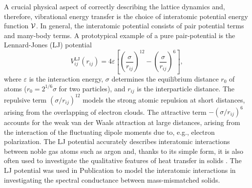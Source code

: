 A crucial physical aspect of correctly describing the lattice dynamics and, therefore, vibrational energy transfer is the choice of interatomic potential energy function $\mathcal{V}$. In general, the interatomic potential consists of pair potential terms and many-body terms. 
A prototypical example of a pure pair-potential is the Lennard-Jones (LJ) potential \cite{allentildesley}
\begin{equation}
 V_{ij}^{\textrm{LJ}}(r_{ij}) = 4\varepsilon \left[\left( \frac{\sigma}{r_{ij}}\right)^{12}-\left( \frac{\sigma}{r_{ij}}\right)^6  \right],
\end{equation}
where $\varepsilon$ is the interaction energy, $\sigma$ determines the equilibrium distance $r_0$ of atoms ($r_0=2^{1/6}\sigma$ for two particles), and $r_{ij}$ is the interparticle distance. The repulsive term $(\sigma/r_{ij})^{12}$ models the strong atomic repulsion at short distances, arising from the overlapping of electron clouds. The attractive term $-(\sigma/r_{ij})^{6}$ accounts for the weak van der Waals attraction at large distances, arising from the interaction of the fluctuating dipole moments due to, e.g., electron polarization. The LJ potential accurately describes interatomic interactions between noble gas atoms such as argon and, thanks to its simple form, it is also often used to investigate the qualitative features of heat transfer in solids \cite{}. The LJ potential was used in Publication  to model the interatomic interactions in investigating the spectral conductance between mass-mismatched solids. %

